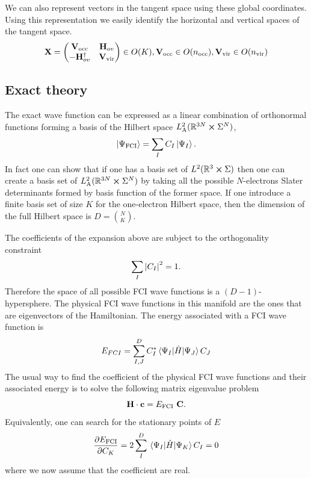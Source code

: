 \documentclass[11pt,a4paper]{article}
\newcommand{\hH}{\Hat{H}} %
\newcommand{\FCI}{\text{FCI}}
\newcommand{\occ}{\text{occ}}
\newcommand{\vir}{\text{vir}}
\begin{document}
We can also represent vectors in the tangent space using these global coordinates. Using this representation we easily identify the horizontal and vertical spaces of the tangent space.
\begin{equation}
  \label{eq:HF_VerticalHorizontalSpaces}
  \vb{X} =
  \begin{pmatrix}
    \vb{V}_\occ & \vb{H}_{ov} \\ -\vb{H}_{ov}^\dagger & \vb{V}_\vir
  \end{pmatrix}\in O(K), \vb{V}_\occ \in O(n_\occ), \vb{V}_\vir \in O(n_\vir)
\end{equation}

\subsection{Exact theory}
\label{sec=exactTheory}

The exact wave function can be expressed as a linear combination of orthonormal functions forming a basis of the Hilbert space $L^2_{\text{A}}(\mathbb{R}^{3N}\cross \Sigma^N)$,
\begin{equation}
  \label{eq:FCI_WF}
  \ket{\Psi_{\FCI}} = \sum_I C_I\ket{\Psi_I}.
\end{equation}
In fact one can show that if one has a basis set of $L^2(\mathbb{R}^{3}\cross \Sigma)$ then one can create a basis set of $L^2_{\text{A}}(\mathbb{R}^{3N}\cross \Sigma^N)$ by taking all the possible $N$-electrons Slater determinants formed by basis function of the former space.
If one introduce a finite basis set of size $K$ for the one-electron Hilbert space, then the dimension of the full Hilbert space is $D=\binom{N}{K}$.

The coefficients of the expansion above are subject to the orthogonality constraint
\begin{equation}
  \label{eq:FCI_OrthoConstraint}
  \sum_I \abs{C_I}^2 = 1.
\end{equation}
Therefore the space of all possible FCI wave functions is a $(D-1)$-hypersphere. The physical FCI wave functions in this manifold are the ones that are eigenvectors of the Hamiltonian.
The energy associated with a FCI wave function is
\begin{equation}
  \label{eq:FCI_NRJ}
  E_{FCI} = \sum_{I,J}^D C_I^* \mel{\Psi_I}{\hH}{\Psi_J} C_J
\end{equation}
The usual way to find the coefficient of the physical FCI wave functions and their associated energy is to solve the following matrix eigenvalue problem
\begin{equation}
  \label{eq:FCI_MatrixEq}
  \vb{H}\cdot\vb{c}=E_{\FCI}~\vb{C}.
\end{equation}
Equivalently, one can search for the stationary points of $E$
\begin{equation}
  \label{eq:FCI_Grad}
  \pdv{E_{\FCI}}{C_K} = 2 \sum_I^D \mel{\Psi_I}{\hH}{\Psi_K} C_I = 0
\end{equation}
where we now assume that the coefficient are real.
\end{document}
